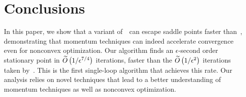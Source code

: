 

\section{Conclusions}
In this paper, we show that a variant of~\nag~can escape saddle points faster than~\gd, demonstrating that momentum techniques can indeed accelerate convergence even for nonconvex optimization. Our algorithm finds an $\epsilon$-second order stationary point in $\widetilde{O}\left({1/\epsilon^{7/4}}\right)$ iterations, faster than the $\widetilde{O}\left({1/\epsilon^2}\right)$ iterations taken by~\gd. This is the first single-loop algorithm that achieves this rate. Our analysis relies on novel techniques that lead to a better understanding of momentum techniques as well as nonconvex optimization.


%
%
